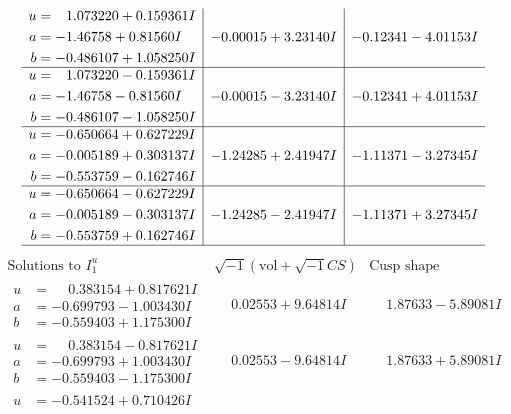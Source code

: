 \documentclass[1p]{elsarticle_modified}
\theoremstyle{definition}
\newcommand{\I}{\sqrt{-1}}
\begin{document}
$$\begin{array}{c|c|c}
\begin{aligned}
u &= \phantom{-}1.073220 + 0.159361 I \\
a &= -1.46758 + 0.81560 I \\
b &= -0.486107 + 1.058250 I\end{aligned}
 & -0.00015 + 3.23140 I & -0.12341 - 4.01153 I \\ \hline\begin{aligned}
u &= \phantom{-}1.073220 - 0.159361 I \\
a &= -1.46758 - 0.81560 I \\
b &= -0.486107 - 1.058250 I\end{aligned}
 & -0.00015 - 3.23140 I & -0.12341 + 4.01153 I \\ \hline\begin{aligned}
u &= -0.650664 + 0.627229 I \\
a &= -0.005189 + 0.303137 I \\
b &= -0.553759 - 0.162746 I\end{aligned}
 & -1.24285 + 2.41947 I & -1.11371 - 3.27345 I \\ \hline\begin{aligned}
u &= -0.650664 - 0.627229 I \\
a &= -0.005189 - 0.303137 I \\
b &= -0.553759 + 0.162746 I\end{aligned}
 & -1.24285 - 2.41947 I & -1.11371 + 3.27345 I\\
 \hline 
 \end{array}$$\newpage$$\begin{array}{c|c|c}  
\text{Solutions to }I^u_{1}& \I (\text{vol} + \sqrt{-1}CS) & \text{Cusp shape}\\
 \hline 
\begin{aligned}
u &= \phantom{-}0.383154 + 0.817621 I \\
a &= -0.699793 - 1.003430 I \\
b &= -0.559403 + 1.175300 I\end{aligned}
 & \phantom{-}0.02553 + 9.64814 I & \phantom{-}1.87633 - 5.89081 I \\ \hline\begin{aligned}
u &= \phantom{-}0.383154 - 0.817621 I \\
a &= -0.699793 + 1.003430 I \\
b &= -0.559403 - 1.175300 I\end{aligned}
 & \phantom{-}0.02553 - 9.64814 I & \phantom{-}1.87633 + 5.89081 I \\ \hline\begin{aligned}
u &= -0.541524 + 0.710426 I \\

\end{aligned}
\end{array}$$
\end{document}
